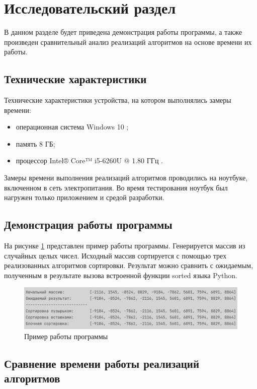 \section{Исследовательский раздел}

В данном разделе будет приведена демонстрация работы программы, а также произведен сравнительный анализ реализаций алгоритмов на основе времени их работы.

\subsection{Технические характеристики}

Технические характеристики устройства, на котором выполнялись замеры времени:

\begin{itemize}
	\item операционная система Windows 10 \cite{windows};
	\item память 8 ГБ;
	\item процессор Intel® Core™ i5-6260U @ 1.80 ГГц \cite{processor}.
\end{itemize}

Замеры времени выполнения реализаций алгоритмов проводились на ноутбуке, включенном в сеть электропитания. 
Во время тестирования ноутбук был нагружен только приложением и средой разработки.

\subsection{Демонстрация работы программы}

На рисунке \ref{fig:output} представлен пример работы программы. 
Генерируется массив из случайных целых чисел.
Исходный массив сортируется с помощью трех реализованных алгоритмов сортировки. 
Результат можно сравнить с ожидаемым, полученным в результате вызова встроенной функции sorted языка Python.

\begin{figure}[h!btp]
	\centering
	\includegraphics[width=480pt]{inc/output.png}
	\caption{Пример работы программы}
	\label{fig:output}	
\end{figure}

\subsection{Сравнение времени работы реализаций алгоритмов} \label{time-comp"}

